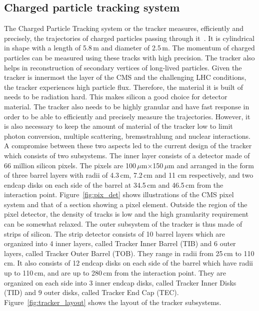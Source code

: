 \subsection{Charged particle tracking system}
\label{tracker}
The Charged Particle Tracking system or the tracker measures, efficiently and precisely, the trajectories of charged particles passing through it~\cite{cms_exp_ref, pix_det, pix_det2}. It is cylindrical in shape with a length of 5.8\,m and diameter of 2.5\,m. The momentum of charged particles can be measured using these tracks with high precision. The tracker also helps in reconstruction of secondary vertices of long-lived particles. Given the tracker is innermost the layer of the CMS and the challenging LHC conditions, the tracker experiences high particle flux. Therefore, the material it is built of needs to be radiation hard. This makes silicon a good choice for detector material. The tracker also needs to be highly granular and have fast response in order to be able to efficiently and precisely measure the trajectories. However, it is also necessary to keep the amount of material of the tracker low to limit photon conversion, multiple scattering, bremsstrahlung and nuclear interactions. A compromise between these two aspects led to the current design of the tracker which consists of two subsystems. The inner layer consists of a detector made of 66 million silicon pixels. The pixels are 100\,$\mu$m$\times$150\,$\mu$m and arranged in the form of three barrel layers with radii of 4.3\,cm, 7.2\,cm and 11 cm respectively, and two endcap disks on each side of the barrel at 34.5\,cm and 46.5\,cm from the interaction point. Figure~\ref{fig:pix_det} shows illustrations of the CMS pixel system and that of a section showing a pixel element. Outside the region of the pixel detector, the density of tracks is low and the high granularity requirement can be somewhat relaxed. The outer subsystem of the tracker is thus made of strips of silicon. The strip detector consists of 10 barrel layers which are organized into 4 inner layers, called Tracker Inner Barrel (TIB) and 6 outer layers, called Tracker Outer Barrel (TOB). They range in radii from 25\,cm to 110\,cm. It also consists of 12 endcap disks on each side of the barrel which have radii up to 110\,cm, and are up to 280\,cm from the interaction point. They are organized on each side into 3 inner endcap disks, called Tracker Inner Disks (TID) and 9 outer disks, called Tracker End Cap (TEC). Figure~\ref{fig:tracker_layout} shows the layout of the tracker subsystems.    

